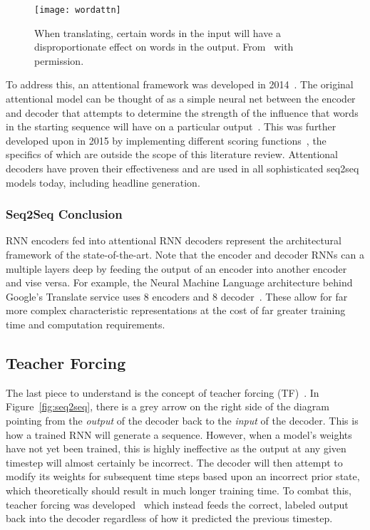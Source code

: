 \begin{figure}[h]
  \centering
  \texttt{[image: wordattn]}
  \caption[Attentional word diagram for English to French Translation]{When translating, certain words in the input will have a disproportionate effect on words in the output. From~\cite{Olah2015} with permission.}
  \label{fig:wordattn}
\end{figure}

To address this, an attentional framework was developed in 2014~\cite{Bahdanau2014}. The original attentional model can be thought of as a simple neural net between the encoder and decoder that attempts to determine the strength of the influence that words in the starting sequence will have on a particular output~\cite{Bahdanau2014}. This was further developed upon in 2015 by implementing different scoring functions~\cite{Luong2015}, the specifics of which are outside the scope of this literature review. Attentional decoders have proven their effectiveness and are used in all sophisticated seq2seq models today, including headline generation.

\subsubsection{Seq2Seq Conclusion}
RNN encoders fed into attentional RNN decoders represent the architectural framework of the state-of-the-art. Note that the encoder and decoder RNNs can a multiple layers deep by feeding the output of an encoder into another encoder and vise versa. For example, the Neural Machine Language architecture behind Google's Translate service uses 8 encoders and 8 decoder~\cite{Wu2016}. These allow for far more complex characteristic representations at the cost of far greater training time and computation requirements.

\subsection{Teacher Forcing}\label{tf}
The last piece to understand is the concept of teacher forcing (TF)~\cite{Williams1989}. In Figure~\ref{fig:seq2seq}, there is a grey arrow on the right side of the diagram pointing from the \textit{output} of the decoder back to the \textit{input} of the decoder. This is how a trained RNN will generate a sequence. However, when a model's weights have not yet been trained, this is highly ineffective as the output at any given timestep will almost certainly be incorrect. The decoder will then attempt to modify its weights for subsequent time steps based upon an incorrect prior state, which theoretically should result in much longer training time. To combat this, teacher forcing was developed~\cite{Williams1989} which instead feeds the correct, labeled output back into the decoder regardless of how it predicted the previous timestep.

